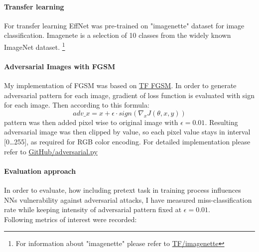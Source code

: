 \paragraph{Transfer learning}
For transfer learning EffNet was pre-trained on "imagenette" dataset for image classification.
Imagenete is a selection of 10 classes from the widely known ImageNet dataset. \footnote{
    For information about "imagenette" please refer to \href{https://www.tensorflow.org/datasets/catalog/imagenette}{TF/imagenette}
}

\paragraph{Adversarial Images with FGSM}
My implementation of FGSM was based on \href{https://www.tensorflow.org/tutorials/generative/adversarial_fgsm}{TF FGSM}.
In order to generate adversarial pattern for each image, gradient of loss function is evaluated with sign for each image.
Then according to this formula:
\begin{equation}
    adv\_x = x + \epsilon \cdot sign(\nabla_x J(\theta, x, y))
\end{equation}
pattern was then added pixel wise to original image with $\epsilon = 0.01$.
Resulting adversarial image was then clipped by value, so each pixel value stays in interval [0\ldots255],
as required for RGB color encoding.
For detailed implementation please refer to \href{https://github.com/Goofy-Goof/ISS/blob/33a2ad40b779ff230aae31c29d2edc2cf5d90406/impl/util/adversarial.py}{GitHub/adversarial.py}

\paragraph{Evaluation approach}
In order to evaluate, how including pretext task in training process influences NNs vulnerability against adversarial attacks,
I have measured miss-classification rate while keeping intensity of adversarial pattern fixed at $\epsilon = 0.01$.
\\
Following metrics of interest were recorded:

